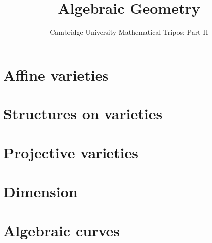 \documentclass{article}
\title{Algebraic Geometry}
\author{Cambridge University Mathematical Tripos: Part II}
\begin{document}
\maketitle

\tableofcontentsnewpage{}


\section{Affine varieties}

\section{Structures on varieties}

\section{Projective varieties}

\section{Dimension}

\section{Algebraic curves}

\end{document}
